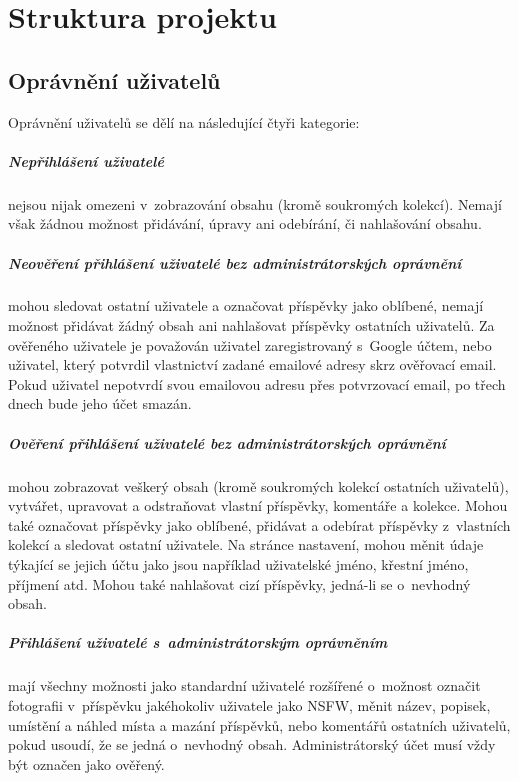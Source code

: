 \documentclass[12pt, a4paper,
  oneside,      %
]{report}
\begin{document}
\chapter{Struktura projektu}
\section{Oprávnění uživatelů}
Oprávnění uživatelů se dělí na následující čtyři kategorie:
\paragraph{Nepřihlášení uživatelé} nejsou nijak omezeni v~zobrazování obsahu (kromě soukromých kolekcí). Nemají však žádnou možnost přidávání, úpravy ani odebírání, či nahlašování obsahu.
\paragraph{Neověření přihlášení uživatelé bez administrátorských oprávnění} mohou sledovat ostatní uživatele a označovat příspěvky jako oblíbené, nemají možnost přidávat žádný obsah ani nahlašovat příspěvky ostatních uživatelů. Za ověřeného uživatele je považován uživatel zaregistrovaný s~Google účtem, nebo uživatel, který potvrdil vlastnictví zadané emailové adresy skrz ověřovací email. Pokud uživatel nepotvrdí svou emailovou adresu přes potvrzovací email, po třech dnech bude jeho účet smazán.
\paragraph{Ověření přihlášení uživatelé bez administrátorských oprávnění}\label{paragraph:verifiedUser} mohou zobrazovat veškerý obsah (kromě soukromých kolekcí ostatních uživatelů), vytvářet, upravovat a odstraňovat vlastní příspěvky, komentáře a kolekce. Mohou také označovat příspěvky jako oblíbené, přidávat a odebírat příspěvky z~vlastních kolekcí a sledovat ostatní uživatele. Na stránce nastavení, mohou měnit údaje týkající se jejich účtu jako jsou například uživatelské jméno, křestní jméno, příjmení atd. Mohou také nahlašovat cizí příspěvky, jedná-li se o~nevhodný obsah.
\paragraph{Přihlášení uživatelé s~administrátorským oprávněním}\label{paragraph:usersWithAdminPermissions} mají všechny možnosti jako standardní uživatelé rozšířené o~možnost označit fotografii v~příspěvku jakéhokoliv uživatele jako NSFW, měnit název, popisek, umístění a náhled místa a mazání příspěvků, nebo komentářů ostatních uživatelů, pokud usoudí, že se jedná o~nevhodný obsah. Administrátorský účet musí vždy být označen jako ověřený.
\end{document}

